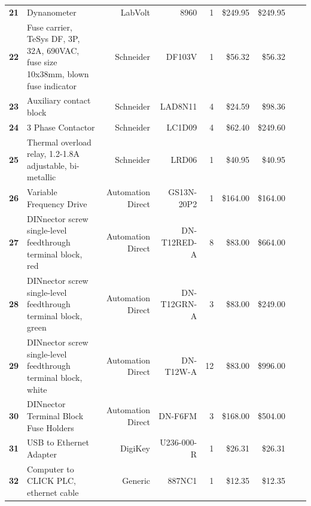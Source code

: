 \begin{table}[!htp]
{\begin{tabular}{llrrrrrrr}
      \textbf{21}    & Dynanometer                                                                      & LabVolt           & 8960              & 1        & \$249.95 & \$249.95       \\
      \textbf{22}    & Fuse carrier, TeSys DF, 3P, 32A, 690VAC, fuse size 10x38mm, blown fuse indicator & Schneider         & DF103V            & 1        & \$56.32  & \$56.32        \\
      \textbf{23}    & Auxiliary contact block                                                          & Schneider         & LAD8N11           & 4        & \$24.59  & \$98.36        \\
      \textbf{24}    & 3 Phase Contactor                                                                & Schneider         & LC1D09            & 4        & \$62.40  & \$249.60       \\
      \textbf{25}    & Thermal overload relay, 1.2-1.8A adjustable, bi-metallic                         & Schneider         & LRD06             & 1        & \$40.95  & \$40.95        \\
      \textbf{26}    & Variable Frequency Drive                                                         & Automation Direct & GS13N-20P2        & 1        & \$164.00 & \$164.00       \\
      \textbf{27}    & DINnector screw single-level feedthrough terminal block, red                     & Automation Direct & DN-T12RED-A       & 8        & \$83.00  & \$664.00       \\
      \textbf{28}    & DINnector screw single-level feedthrough terminal block, green                   & Automation Direct & DN-T12GRN-A       & 3        & \$83.00  & \$249.00       \\
      \textbf{29}    & DINnector screw single-level feedthrough terminal block, white                   & Automation Direct & DN-T12W-A         & 12       & \$83.00  & \$996.00       \\
      \textbf{30}    & DINnector Terminal Block Fuse Holders                                            & Automation Direct & DN-F6FM           & 3        & \$168.00 & \$504.00       \\
      \textbf{31}    & USB to Ethernet Adapter                                                          & DigiKey           & U236-000-R        & 1        & \$26.31  & \$26.31        \\
      \textbf{32}    & Computer to CLICK PLC, ethernet cable                                            & Generic           & 887NC1            & 1        & \$12.35  & \$12.35        \\

\end{tabular}}
\end{table}
